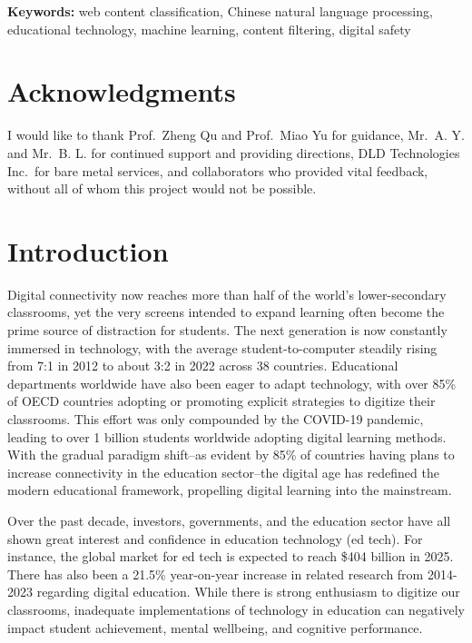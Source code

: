 \documentclass[
  titlepage]{article}
\begin{document}
\textbf{Keywords:} web content classification, Chinese natural language
processing, educational technology, machine learning, content filtering,
digital safety

\newpage

\section*{Acknowledgments}\label{acknowledgments}

I would like to thank Prof.~Zheng Qu and Prof.~Miao Yu for guidance,
Mr.~A. Y. and Mr.~B. L. for continued support and providing directions,
DLD Technologies Inc.~for bare metal services, and collaborators who
provided vital feedback, without all of whom this project would not be
possible.

\section{Introduction}\label{introduction}

Digital connectivity now reaches more than half of the world's
lower-secondary classrooms, yet the very screens intended to expand
learning often become the prime source of distraction for students. The
next generation is now constantly immersed in technology, with the
average student-to-computer steadily rising from 7:1 in 2012 to about
3:2 in 2022 across 38 countries. Educational departments worldwide have
also been eager to adapt technology, with over 85\% of OECD countries
adopting or promoting explicit strategies to digitize their classrooms.
This effort was only compounded by the COVID-19 pandemic, leading to
over 1 billion students worldwide adopting digital learning methods.
With the gradual paradigm shift--as evident by 85\% of countries having
plans to increase connectivity in the education sector--the digital age
has redefined the modern educational framework, propelling digital
learning into the mainstream.

Over the past decade, investors, governments, and the education sector
have all shown great interest and confidence in education technology (ed
tech). For instance, the global market for ed tech is expected to reach
\$404 billion in 2025. There has also been a 21.5\% year-on-year
increase in related research from 2014-2023 regarding digital education.
While there is strong enthusiasm to digitize our classrooms, inadequate
implementations of technology in education can negatively impact student
achievement, mental wellbeing, and cognitive performance.
\end{document}
